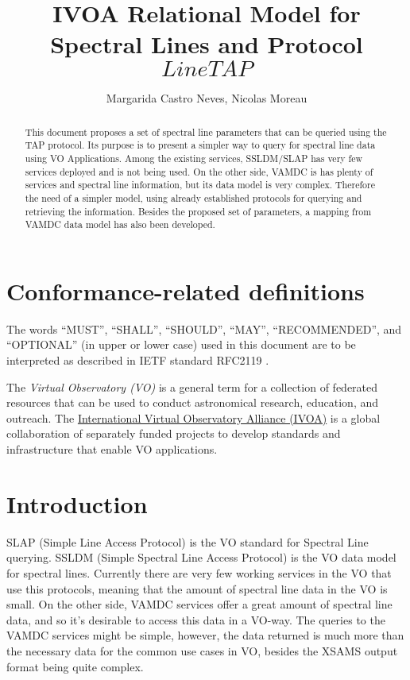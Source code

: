 \documentclass[11pt,a4paper]{ivoa}
\title{IVOA Relational Model for Spectral Lines and Protocol \(LineTAP\)}
\author{Margarida Castro Neves, Nicolas Moreau}
\begin{document}
\begin{abstract}

This document proposes a set of  spectral line parameters that can be queried using the TAP protocol. Its purpose is to present a simpler way to query for spectral line data using VO Applications. Among the existing services, SSLDM/SLAP has very few services deployed and is not being used. On the other side, VAMDC is has plenty of services and spectral line information, but its data model is very complex. Therefore the need of a simpler model, using already established protocols for querying and retrieving the information. Besides the proposed set of parameters, a mapping from VAMDC data model has also been developed.

\end{abstract}




\section*{Conformance-related definitions}

The words ``MUST'', ``SHALL'', ``SHOULD'', ``MAY'', ``RECOMMENDED'', and
``OPTIONAL'' (in upper or lower case) used in this document are to be
interpreted as described in IETF standard RFC2119 \citep{std:RFC2119}.

The \emph{Virtual Observatory (VO)} is a
general term for a collection of federated resources that can be used
to conduct astronomical research, education, and outreach.
The \href{http://www.ivoa.net}{International
Virtual Observatory Alliance (IVOA)} is a global
collaboration of separately funded projects to develop standards and
infrastructure that enable VO applications.


\section{Introduction}

SLAP (Simple Line Access Protocol)\citep{2010ivoa.specQ1209O} is the VO standard for Spectral Line querying. SSLDM (Simple Spectral Line Access Protocol)\citep{2010ivoa.spec.1209O} is the VO data model for spectral lines.
Currently there are very few working services in the VO that use this protocols, meaning that the amount of spectral line data in the VO is small. 
On the other side, VAMDC services offer a great amount of spectral line data, and  so it's desirable to access this data in a VO-way. 
The queries to the VAMDC services might be simple, however, the data returned is much more than the necessary data for the common use cases in VO, besides the XSAMS \citep{XSAMS:Docs} output format being quite complex.
\end{document}
